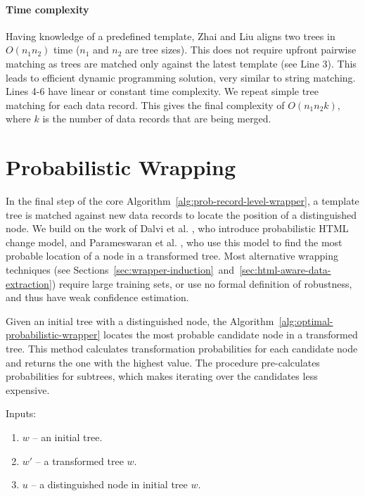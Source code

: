 \paragraph{Time complexity} Having knowledge of a predefined template, Zhai and Liu \cite{zhai2005a} aligns two trees in $O(n_1 n_2)$ time ($n_1$ and $n_2$ are tree sizes). This does not require upfront pairwise matching as trees are matched only against the latest template (see Line 3). This leads to efficient dynamic programming solution, very similar to string matching. Lines 4-6 have linear or constant time complexity. We repeat simple tree matching for each data record. This gives the final complexity of $O(n_1 n_2 k)$, where $k$ is the number of data records that are being merged.


\section{Probabilistic Wrapping}

In the final step of the core Algorithm~\ref{alg:prob-record-level-wrapper}, a template tree is matched against new data records to locate the position of a distinguished node. We build on the work of Dalvi et al. \cite{dalvi2009a}, who introduce probabilistic HTML change model, and Parameswaran et al. \cite{DBLP:journals/pvldb/ParameswaranDGR11}, who use this model to find the most probable location of a node in a transformed tree. Most alternative wrapping techniques (see Sections~\ref{sec:wrapper-induction}~and~\ref{sec:html-aware-data-extraction}) require large training sets, or use no formal definition of robustness, and thus have weak confidence estimation.

Given an initial tree with a distinguished node, the Algorithm~\ref{alg:optimal-probabilistic-wrapper} locates the most probable candidate node in a transformed tree. This method calculates transformation probabilities for each candidate node and returns the one with the highest value. The procedure pre-calculates probabilities for subtrees, which makes iterating over the candidates less expensive.

Inputs: 

\begin{enumerate}
	\item $w$ -- an initial tree.
	\item $w'$ -- a transformed tree $w$.
	\item $u$ -- a distinguished node in initial tree $w$.
\end{enumerate}

